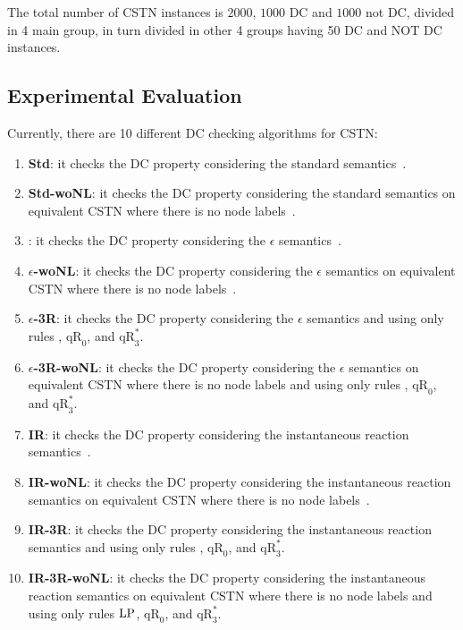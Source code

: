 \documentclass[a4paper,11pt]{article}
\begin{document}
The total number of CSTN instances is $2000$, $1000$ DC and $1000$ not DC, divided in 4 main group, in turn divided in other 4 groups having 50 DC and NOT DC instances.

  
\subsection{Experimental Evaluation}

Currently, there are 10 different DC checking algorithms for CSTN:
\begin{enumerate}
  \item \textbf{Std}: it checks the DC property considering the standard semantics~\cite{HunsbergerP16Icaps}.
  \item \textbf{Std-woNL}: it checks the DC property considering the standard semantics on equivalent CSTN where there is no node labels~\cite{CairoEtalTime2017}.
  \item \boldmath{$\epsilon$}: it checks the DC property considering the $\epsilon$ semantics~\cite{HunsbergerP16Icaps}. %
  \item \textbf{$\epsilon$-woNL}: it checks the DC property considering the $\epsilon$ semantics on equivalent CSTN where there is no node labels~\cite{CairoEtalTime2017}.
  \item \textbf{$\epsilon$-3R}: it checks the DC property considering the $\epsilon$ semantics and using only rules \LP, $\mathup{qR}_0$, and $\mathup{qR}_3^*$.
  \item \textbf{$\epsilon$-3R-woNL}: it checks the DC property considering the $\epsilon$ semantics on equivalent CSTN where there is no node labels and using only rules \LP, $\mathup{qR}_0$, and $\mathup{qR}_3^*$.
  \item \textbf{IR}: it checks the DC property considering the instantaneous reaction semantics~\cite{HunsbergerP16Icaps}.
  \item \textbf{IR-woNL}: it checks the DC property considering the instantaneous reaction semantics on equivalent CSTN where there is no node labels~\cite{CairoEtalTime2017}.
  \item \textbf{IR-3R}: it checks the DC property considering the instantaneous reaction semantics and using only rules \LP, $\mathup{qR}_0$, and $\mathup{qR}_3^*$.
  \item \textbf{IR-3R-woNL}: it checks the DC property considering the instantaneous reaction semantics on equivalent CSTN where there is no node labels and using only rules $\text{\textup{LP}}$, $\mathup{qR}_0$, and $\mathup{qR}_3^*$.
\end{enumerate} 
\end{document}
